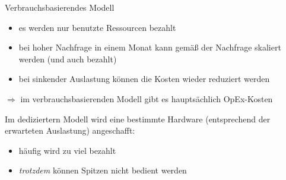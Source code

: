 \begin{flashcard}[Definition]{Verbrauchsbasierendes Modell}
        \begin{itemize}
            \item es werden nur benutzte Ressourcen bezahlt
            \item bei hoher Nachfrage in einem Monat kann gemäß der Nachfrage skaliert werden (und auch bezahlt)
            \item bei sinkender Auslastung können die Kosten wieder reduziert werden
        \end{itemize}
        $\Rightarrow$ im verbrauchsbasierenden Modell gibt es hauptsächlich OpEx-Kosten

        \vspace{5mm}
        Im dediziertern Modell wird eine bestimmte Hardware (entsprechend der erwarteten Auslastung) angeschafft:
        \begin{itemize}
            \item häufig wird zu viel bezahlt
            \item \emph{trotzdem} können Spitzen nicht bedient werden
        \end{itemize}
\end{flashcard}
